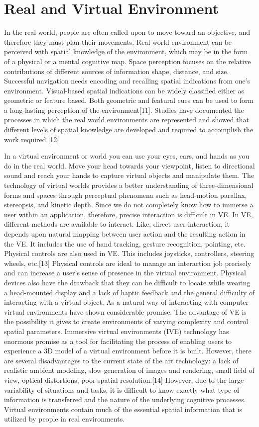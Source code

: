 \section{Real and Virtual Environment}
In the real world, people are often called upon to move toward an objective, and therefore they must plan their movements. Real world environment can be perceived with spatial knowledge of the environment, which may be in the form of a physical or a mental cognitive map. Space perception focuses on the relative contributions of different sources of information shape, distance, and size. Successful navigation needs encoding and recalling spatial indications from one's environment. Visual-based spatial indications can be widely classified either as geometric or feature based. Both geometric and featural cues can be used to form a long-lasting perception of the environment[11]. Studies have documented the processes in which the real world environments are represented and showed that different levels of spatial knowledge are developed and required to accomplish the work required.[12] 

In a virtual environment or world you can use your eyes, ears, and hands as you do in the real world. Move your head towards your viewpoint, listen to directional sound and reach your hands to capture virtual objects and manipulate them. The technology of virtual worlds provides a better understanding of three-dimensional forms and spaces through perceptual phenomena such as head-motion parallax, stereopsis, and kinetic depth. Since we do not completely know how to immerse a user within an application, therefore, precise interaction is difficult in VE. In VE, different methods are available to interact. Like, direct user interaction, it depends upon natural mapping between user action and the resulting action in the VE. It includes the use of hand tracking, gesture recognition, pointing, etc. Physical controls are also used in VE. This includes joysticks, controllers, steering wheels, etc.[13] Physical controls are ideal to manage an interaction job precisely and can increase a user's sense of presence in the virtual environment. Physical devices also have the drawback that they can be difficult to locate while wearing a head-mounted display and a lack of haptic feedback and the general difficulty of interacting with a virtual object. As a natural way of interacting with computer virtual environments have shown considerable promise. The advantage of VE is the possibility it gives to create environments of varying complexity and control spatial parameters. Immersive virtual environments (IVE) technology has enormous promise as a tool for facilitating the process of enabling users to experience a 3D model of a virtual environment before it is built. However, there are several disadvantages to the current state of the art technology: a lack of realistic ambient modeling, slow generation of images and rendering, small field of view, optical distortions, poor spatial resolution.[14]
However, due to the large variability of situations and tasks, it is difficult to know exactly what type of information is transferred and the nature of the underlying cognitive processes.
Virtual environments contain much of the essential spatial information that is utilized by people in real environments.


